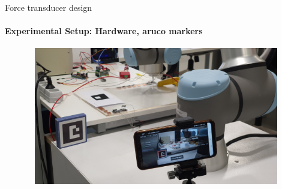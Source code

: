 \documentclass[aspectratio=169]{beamer}
\begin{document}
\begin{frame}[t]{Force transducer design}
    \framesubtitle{Experimental Setup: Hardware, aruco markers}
    \vspace{-15pt}
    \begin{figure}[H]
        \centering\includegraphics[height=6cm,width=1\textwidth,keepaspectratio]{exp_stand2}
        \label{fig:exp_stand2}
    \end{figure}
\end{frame}
\end{document}
